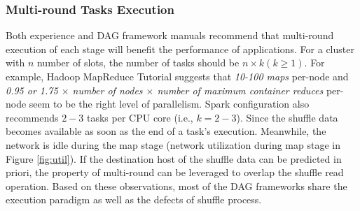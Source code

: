 \subsubsection{Multi-round Tasks Execution}\label{multi}
\ifrevision
{}
\fi
Both experience and DAG framework manuals recommend that multi-round execution of each stage will benefit the performance of applications.
For a cluster with $n$ number of slots, the number of tasks should be $n \times k (k \geq 1)$. 
For example, Hadoop MapReduce Tutorial \cite{hadooptutorial} suggests that \textit{10-100 maps} per-node and \textit{0.95 or 1.75 $\times$ number of nodes $\times$ number of maximum container reduces} per-node seem to be the right level of parallelism. 
Spark configuration also recommends $2-3$ tasks per CPU core \cite{sparkconf} (i.e., $k = 2-3$).
Since the shuffle data becomes available as soon as the end of a task's execution. 
Meanwhile, the network is idle during the map stage (network utilization during map stage in Figure \ref{fig:util}). 
If the destination host of the shuffle data can be predicted in priori, the property of multi-round can be leveraged to overlap the shuffle read operation.
\ifrevision
{}
\fi
Based on these observations, most of the DAG frameworks share the execution paradigm as well as the defects of shuffle process. 

